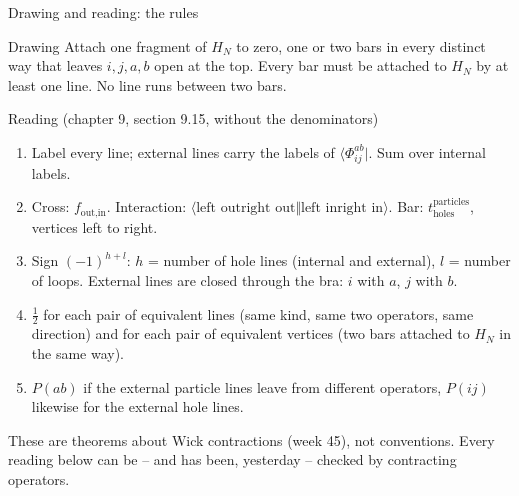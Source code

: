 \documentclass[aspectratio=169,10pt]{beamer}
\newcommand{\bra}[1]{\langle #1\vert}
\newcommand{\as}[4]{\langle #1#2\Vert #3#4\rangle}
\begin{document}
\begin{frame}[shrink=7]{Drawing and reading: the rules}
\small
\begin{block}{Drawing}
Attach one fragment of $H_N$ to zero, one or two bars in every distinct way that leaves $i,j,a,b$ open at the top. Every bar must be attached to $H_N$ by at least one line. No line runs between two bars.
\end{block}
\begin{block}{Reading (chapter 9, section 9.15, without the denominators)}
\begin{enumerate}
\item Label every line; external lines carry the labels of $\bra{\Phi_{ij}^{ab}}$. Sum over internal labels.
\item Cross: $f_{\text{out},\text{in}}$. Interaction: $\as{\text{left out}}{\text{right out}}{\text{left in}}{\text{right in}}$. Bar: $t_{\text{holes}}^{\text{particles}}$, vertices left to right.
\item Sign $(-1)^{h+l}$: $h$ = number of hole lines (internal and external), $l$ = number of loops. External lines are closed through the bra: $i$ with $a$, $j$ with $b$.
\item $\tfrac12$ for each pair of equivalent lines (same kind, same two operators, same direction) and for each pair of equivalent vertices (two bars attached to $H_N$ in the same way).
\item $P(ab)$ if the external particle lines leave from different operators, $P(ij)$ likewise for the external hole lines.
\end{enumerate}
\end{block}
These are theorems about Wick contractions (week 45), not conventions. Every reading below can be -- and has been, yesterday -- checked by contracting operators.
\end{frame}
\end{document}
